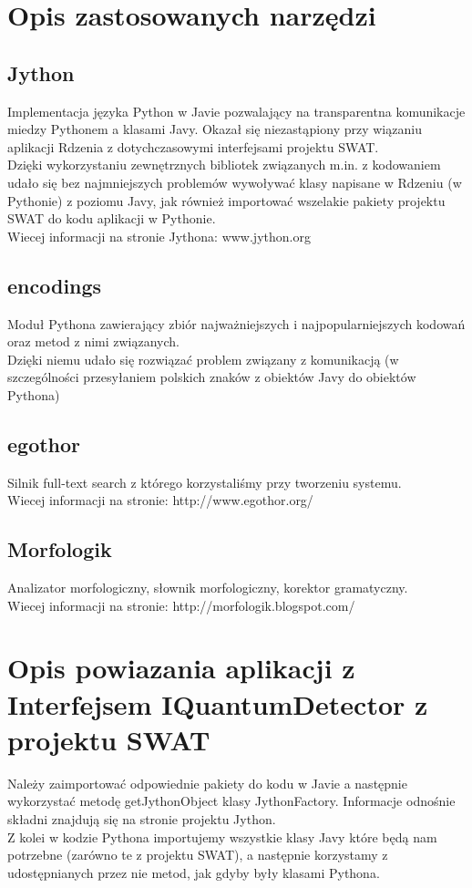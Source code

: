 \documentclass[12pt]{article}
\begin{document}
\section {Opis zastosowanych narzędzi}

\subsection {Jython} 
Implementacja języka Python w Javie pozwalający na transparentna komunikacje miedzy Pythonem a klasami Javy. Okazał się niezastąpiony przy wiązaniu aplikacji Rdzenia z dotychczasowymi interfejsami projektu SWAT. 
\\Dzięki wykorzystaniu zewnętrznych bibliotek związanych m.in. z kodowaniem udało się bez najmniejszych problemów wywoływać klasy napisane w Rdzeniu (w Pythonie) z poziomu Javy, jak również importować wszelakie pakiety projektu SWAT do kodu aplikacji w Pythonie.
\\Wiecej informacji na stronie Jythona: www.jython.org

\subsection{encodings}
Moduł Pythona zawierający zbiór najważniejszych i najpopularniejszych kodowań oraz metod z nimi związanych.
\\Dzięki niemu udało się rozwiązać problem związany z komunikacją (w szczególności przesyłaniem polskich znaków z obiektów Javy do obiektów Pythona)

\subsection{egothor}
Silnik full-text search z którego korzystaliśmy przy tworzeniu systemu.
\\Wiecej informacji na stronie: http://www.egothor.org/

\subsection{Morfologik}
Analizator morfologiczny, słownik morfologiczny, korektor gramatyczny.
\\Wiecej informacji na stronie: http://morfologik.blogspot.com/

\section{Opis powiazania aplikacji z Interfejsem IQuantumDetector z projektu SWAT}
Należy zaimportować odpowiednie pakiety do kodu w Javie a następnie wykorzystać metodę getJythonObject
klasy JythonFactory. Informacje odnośnie składni znajdują się na stronie projektu Jython.
\\Z kolei w kodzie Pythona importujemy wszystkie klasy Javy które będą nam potrzebne (zarówno te
z projektu SWAT), a następnie korzystamy z udostępnianych przez nie metod, jak gdyby były klasami Pythona.
\end{document}
